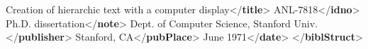 \begin{shaded}
\hspace*{1em}Creation of hierarchic text\mbox{}\newline 
\hspace*{1em}\hspace*{1em}\hspace*{1em}\hspace*{1em} with a computer display{</\textbf{title}>}\mbox{}\newline 
\hspace*{1em}ANL-7818{</\textbf{idno}>}\mbox{}\newline 
\hspace*{1em}Ph.D. dissertation{</\textbf{note}>}\mbox{}\newline 
\hspace*{1em}\mbox{}\newline 
\hspace*{1em}\hspace*{1em}Dept. of Computer Science, Stanford Univ.{</\textbf{publisher}>}\mbox{}\newline 
\hspace*{1em}\hspace*{1em}Stanford, CA{</\textbf{pubPlace}>}\mbox{}\newline 
\hspace*{1em}\hspace*{1em}June 1971{</\textbf{date}>}\mbox{}\newline 
\hspace*{1em}\mbox{}\newline 
{}\mbox{}\newline 
{</\textbf{biblStruct}>}\end{shaded}\egroup\par \par
